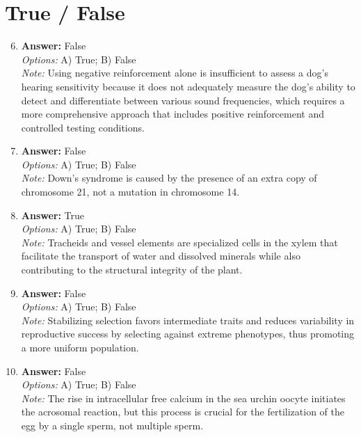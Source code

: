 \documentclass[12pt]{article}
\begin{document}
\section*{True / False}
\begin{enumerate}[label=\arabic*.]
\setcounter{enumi}{5}
\item \textbf{Answer:} False
\\ \textit{Options:} A) True; B) False
\\ \textit{Note:} Using negative reinforcement alone is insufficient to assess a dog's hearing sensitivity because it does not adequately measure the dog's ability to detect and differentiate between various sound frequencies, which requires a more comprehensive approach that includes positive reinforcement and controlled testing conditions.
\item \textbf{Answer:} False
\\ \textit{Options:} A) True; B) False
\\ \textit{Note:} Down's syndrome is caused by the presence of an extra copy of chromosome 21, not a mutation in chromosome 14.
\item \textbf{Answer:} True
\\ \textit{Options:} A) True; B) False
\\ \textit{Note:} Tracheids and vessel elements are specialized cells in the xylem that facilitate the transport of water and dissolved minerals while also contributing to the structural integrity of the plant.
\item \textbf{Answer:} False
\\ \textit{Options:} A) True; B) False
\\ \textit{Note:} Stabilizing selection favors intermediate traits and reduces variability in reproductive success by selecting against extreme phenotypes, thus promoting a more uniform population.
\item \textbf{Answer:} False
\\ \textit{Options:} A) True; B) False
\\ \textit{Note:} The rise in intracellular free calcium in the sea urchin oocyte initiates the acrosomal reaction, but this process is crucial for the fertilization of the egg by a single sperm, not multiple sperm.
\end{enumerate}
\end{document}
